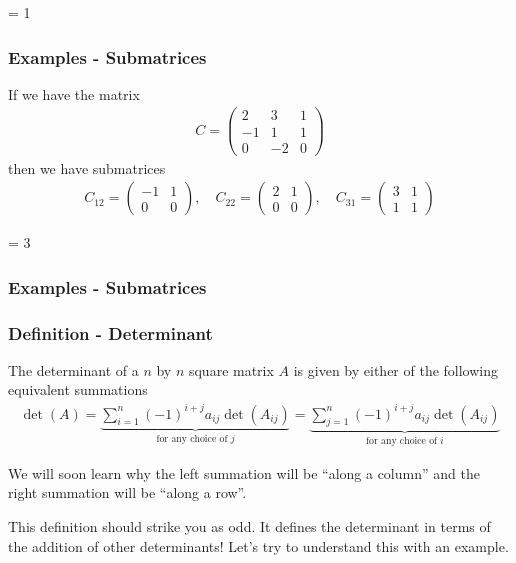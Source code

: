 \documentclass[usenames,dvipsnames,aspectratio=169,10pt]{beamer}
\def \EXAMPLEVERSION {1} %
\numberwithin{equation}{section}
\begin{document}
\ifnum \EXAMPLEVERSION = 1
\begin{frame}
\frametitle{Examples - Submatrices}

If we have the matrix
\begin{align*}
C=
\begin{pmatrix}
 2 &  3 & 1 \\
-1 &  1 & 1 \\
 0 & -2 & 0 
\end{pmatrix}
\end{align*}
then we have submatrices
\begin{align*}
C_{12}=
\begin{pmatrix}
-1 &  1 \\
 0 &  0 
\end{pmatrix}
, \quad
C_{22}=
\begin{pmatrix}
 2 & 1 \\
 0 & 0 
\end{pmatrix}
, \quad
C_{31}=
\begin{pmatrix}
 3 & 1 \\
 1 & 1
\end{pmatrix}
\end{align*}

\end{frame}
\fi 


\ifnum \EXAMPLEVERSION = 3
\begin{frame}
\frametitle{Examples - Submatrices}
\end{frame}
\fi 



\begin{frame}
\frametitle{Definition - Determinant}
The determinant of a $n$ by $n$ square matrix $A$ is given by either of the following equivalent summations
\begin{align*}
\det(A) = \underbrace{\sum_{i=1}^n (-1)^{i+j} a_{ij} \det(A_{ij})}_{\text{for any choice of }j} = \underbrace{\sum_{j=1}^n (-1)^{i+j} a_{ij} \det(A_{ij})}_{\text{for any choice of }i}
\end{align*}

We will soon learn why the left summation will be ``along a column'' and the right summation will be ``along a row''.

This definition should strike you as odd. It defines the determinant in terms of the addition of other determinants! Let's try to understand this with an example.
\end{frame}
\end{document}
